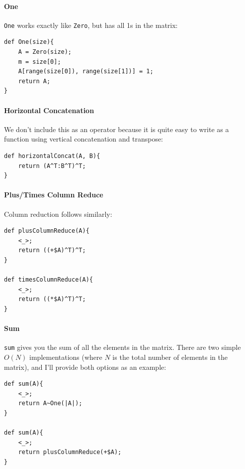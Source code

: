 \paragraph{One}
\verb=One= works exactly like \verb=Zero=, but has all 1s in the matrix:
\begin{lstlisting}
def One(size){
    A = Zero(size);
    m = size[0];
    A[range(size[0]), range(size[1])] = 1;
    return A;
}
\end{lstlisting}

\paragraph{Horizontal Concatenation}
We don't include this as an operator because it is quite easy to write as a function using vertical concatenation and transpose:
\begin{lstlisting}
def horizontalConcat(A, B){
    return (A^T:B^T)^T;
}
\end{lstlisting}

\paragraph{Plus/Times Column Reduce}
Column reduction follows similarly:
\begin{lstlisting}
def plusColumnReduce(A){
    <_>;
    return ((+$A)^T)^T;
}

def timesColumnReduce(A){
    <_>;
    return ((*$A)^T)^T;
}
\end{lstlisting}

\paragraph{Sum}
\verb=sum= gives you the sum of all the elements in the matrix.  There are two simple $O(N)$ implementations (where $N$ is the total number of elements in the matrix), and I'll provide both options as an example:
\begin{lstlisting}
def sum(A){
    <_>;
    return A~One(|A|);
}

def sum(A){
    <_>;
    return plusColumnReduce(+$A);
}
\end{lstlisting}

